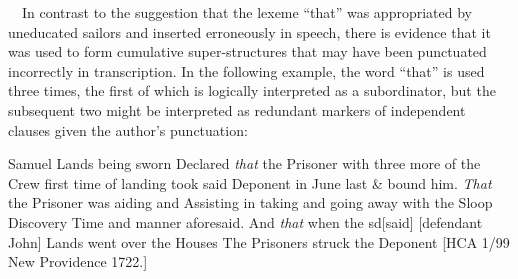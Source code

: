 \begin{styleStandard}
\ \ In contrast to the suggestion that the lexeme “that” was appropriated by uneducated sailors and inserted erroneously in speech, there is evidence that it was used to form cumulative super-structures that may have been punctuated incorrectly in transcription. In the following example, the word “that” is used three times, the first of which is logically interpreted as a subordinator, but the subsequent two might be interpreted as redundant markers of independent clauses given the author’s punctuation:
\end{styleStandard}

\begin{styleStandard}
Samuel Lands being sworn Declared \textit{that }the Prisoner with three more of the Crew first time of landing took said Deponent in June last \& bound him. \textit{That} the Prisoner was aiding and Assisting in taking and going away with the Sloop Discovery Time and manner aforesaid. And \textit{that}\textbf{ }when the sd[said] [defendant John] Lands went over the Houses The Prisoners struck the Deponent [HCA 1/99 New Providence 1722.] 
\end{styleStandard}

